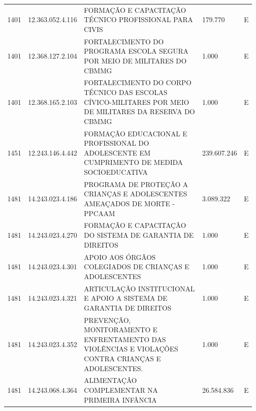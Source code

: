 \documentclass{article}
\begin{document}
\begin{longtable}[c]{m{1cm}|m{2cm}|m{10cm}|m{2cm}|m{1cm}}
\multicolumn{1}{C{1cm}|}{1401} & \multicolumn{1}{C{2cm}|}{12.363.052.4.116} & \multicolumn{1}{L{10cm}|}{FORMAÇÃO E CAPACITAÇÃO TÉCNICO PROFISSIONAL PARA CIVIS} & \multicolumn{1}{R{2cm}|}{179.770} & \multicolumn{1}{C{1cm}}{E} \\
\multicolumn{1}{C{1cm}|}{1401} & \multicolumn{1}{C{2cm}|}{12.368.127.2.104} & \multicolumn{1}{L{10cm}|}{FORTALECIMENTO DO PROGRAMA ESCOLA SEGURA POR MEIO DE MILITARES DO CBMMG} & \multicolumn{1}{R{2cm}|}{1.000} & \multicolumn{1}{C{1cm}}{E} \\
\multicolumn{1}{C{1cm}|}{1401} & \multicolumn{1}{C{2cm}|}{12.368.165.2.103} & \multicolumn{1}{L{10cm}|}{FORTALECIMENTO DO CORPO TÉCNICO DAS ESCOLAS CÍVICO-MILITARES POR MEIO DE MILITARES DA RESERVA DO CBMMG} & \multicolumn{1}{R{2cm}|}{1.000} & \multicolumn{1}{C{1cm}}{E} \\
\multicolumn{1}{C{1cm}|}{1451} & \multicolumn{1}{C{2cm}|}{12.243.146.4.442} & \multicolumn{1}{L{10cm}|}{FORMAÇÃO EDUCACIONAL E PROFISSIONAL DO ADOLESCENTE EM CUMPRIMENTO DE MEDIDA SOCIOEDUCATIVA} & \multicolumn{1}{R{2cm}|}{239.607.246} & \multicolumn{1}{C{1cm}}{E} \\
\multicolumn{1}{C{1cm}|}{1481} & \multicolumn{1}{C{2cm}|}{14.243.023.4.186} & \multicolumn{1}{L{10cm}|}{PROGRAMA DE PROTEÇÃO A CRIANÇAS E ADOLESCENTES AMEAÇADOS DE MORTE - PPCAAM} & \multicolumn{1}{R{2cm}|}{3.089.322} & \multicolumn{1}{C{1cm}}{E} \\
\multicolumn{1}{C{1cm}|}{1481} & \multicolumn{1}{C{2cm}|}{14.243.023.4.270} & \multicolumn{1}{L{10cm}|}{FORMAÇÃO E CAPACITAÇÃO DO SISTEMA DE GARANTIA DE DIREITOS} & \multicolumn{1}{R{2cm}|}{1.000} & \multicolumn{1}{C{1cm}}{E} \\
\multicolumn{1}{C{1cm}|}{1481} & \multicolumn{1}{C{2cm}|}{14.243.023.4.301} & \multicolumn{1}{L{10cm}|}{APOIO AOS ÓRGÃOS COLEGIADOS DE CRIANÇAS E ADOLESCENTES} & \multicolumn{1}{R{2cm}|}{1.000} & \multicolumn{1}{C{1cm}}{E} \\
\multicolumn{1}{C{1cm}|}{1481} & \multicolumn{1}{C{2cm}|}{14.243.023.4.321} & \multicolumn{1}{L{10cm}|}{ARTICULAÇÃO INSTITUCIONAL E APOIO A SISTEMA DE GARANTIA DE DIREITOS} & \multicolumn{1}{R{2cm}|}{1.000} & \multicolumn{1}{C{1cm}}{E} \\
\multicolumn{1}{C{1cm}|}{1481} & \multicolumn{1}{C{2cm}|}{14.243.023.4.352} & \multicolumn{1}{L{10cm}|}{PREVENÇÃO, MONITORAMENTO E ENFRENTAMENTO DAS VIOLÊNCIAS E VIOLAÇÕES CONTRA CRIANÇAS E ADOLESCENTES.} & \multicolumn{1}{R{2cm}|}{1.000} & \multicolumn{1}{C{1cm}}{E} \\
\multicolumn{1}{C{1cm}|}{1481} & \multicolumn{1}{C{2cm}|}{14.243.068.4.364} & \multicolumn{1}{L{10cm}|}{ALIMENTAÇÃO COMPLEMENTAR NA PRIMEIRA INFÂNCIA} & \multicolumn{1}{R{2cm}|}{26.584.836} & \multicolumn{1}{C{1cm}}{E} \\

\end{longtable}
\end{document}
